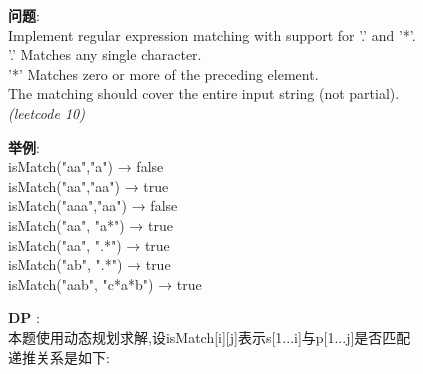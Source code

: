 \documentclass{article}
\begin{document}
\begin{CJK}{UTF8}{gbsn}     %

\else
    
\begin{description}
    \item{\textbf{问题}}:\\
	Implement regular expression matching with support for '.' and '*'.\\
	'.' Matches any single character.\\
	'*' Matches zero or more of the preceding element.\\
	The matching should cover the entire input string (not partial).\\
	\textit{(leetcode 10)}
	\item{\textbf{举例}}: \\
	isMatch("aa","a") → false\\
	isMatch("aa","aa") → true\\
	isMatch("aaa","aa") → false\\
	isMatch("aa", "a*") → true\\
	isMatch("aa", ".*") → true\\
	isMatch("ab", ".*") → true\\
	isMatch("aab", "c*a*b") → true\\
    \item{\textbf{DP}} : 
    \\本题使用动态规划求解,设isMatch[i][j]表示s[1...i]与p[1...j]是否匹配\\
	递推关系是如下:


\end{description}
\end{CJK}
\end{document}
